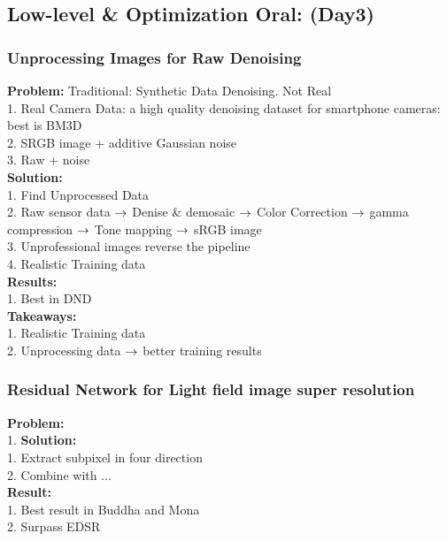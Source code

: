\subsection{Low-level \& Optimization Oral: (Day3)}
\subsubsection{Unprocessing Images for Raw Denoising}
{\bf Problem:} Traditional: Synthetic Data Denoising. Not Real \\
        1. Real Camera Data: a high quality denoising dataset for smartphone cameras: best is BM3D \\
        2. SRGB image + additive Gaussian noise \\
        3. Raw + noise\\
{\bf Solution:} \\
        1. Find Unprocessed Data \\
        2. Raw sensor data $\rightarrow$ Denise \& demosaic $\rightarrow$ Color Correction $\rightarrow$ gamma compression $\rightarrow$ Tone mapping $\rightarrow$ sRGB image \\
        3. Unprofessional images reverse the pipeline \\
        4. Realistic Training data\\
{\bf Results:} \\
        1. Best in DND\\
{\bf Takeaways:} \\
        1. Realistic Training data \\
        2. Unprocessing data $\rightarrow$ better training results \\
\subsubsection{Residual Network for Light field image super resolution}
    {\bf Problem:} \\
        1. 
    {\bf Solution:} \\
        1. Extract subpixel in four direction \\
        2. Combine with ... \\
    {\bf Result:} \\
        1. Best result in Buddha and Mona \\
        2. Surpass EDSR \\
